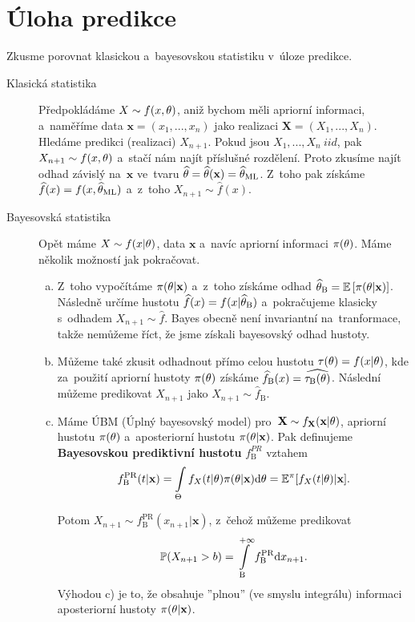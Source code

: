 \section{Úloha predikce}
Zkusme porovnat klasickou a~bayesovskou statistiku v~úloze predikce.
\begin{description}
	\item[Klasická statistika] Předpokládáme $X\sim f(x,\theta)$, aniž bychom měli apriorní informaci, a~naměříme data $\textbf{x}=(x_1,...,x_n)$ jako realizaci $\textbf{X}=(X_1,...,X_n)$. Hledáme predikci (realizaci) $X_{n+1}$. Pokud jsou $X_1,...,X_n ~iid$, pak $X_{n+1}\sim f(x,\theta)$ a~stačí nám najít příslušné rozdělení. Proto zkusíme najít odhad závislý na~$\textbf{x}$ ve~tvaru $\widehat{\theta}=\widehat{\theta}(\textbf{x})=\widehat{\theta}_{\mathrm{ML}}$. Z~toho pak získáme $\widehat{f}(x)=f(x,\widehat{\theta}_\mathrm{ML})$ a~z~toho $X_{n+1}\sim\widehat{f}(x)$.
	\item[Bayesovská statistika] Opět máme $X\sim f(x|\theta)$, data $\textbf{x}$ a~navíc apriorní informaci $\pi(\theta)$. Máme několik možností jak pokračovat.
	\begin{enumerate}[a)]
		\item  Z~toho vypočítáme $\pi(\theta|\textbf{x})$ a~z~toho získáme odhad $\widehat{\theta}_\mathrm{B}=\mathbb{E}\left[ \pi(\theta|\textbf{x}) \right]$. Následně určíme hustotu $\widehat{f}(x)=f(x|\widehat{\theta}_\mathrm{B})$ a~pokračujeme klasicky s~odhadem $X_{n+1}\sim\widehat{f}$. Bayes obecně není invariantní na~tranformace, takže nemůžeme říct, že jsme získali bayesovský odhad hustoty.
		
		\item Můžeme také zkusit odhadnout přímo celou hustotu $\tau(\theta)=f(x|\theta)$, kde za~použití apriorní hustoty $\pi(\theta)$ získáme $\widehat{f}_\mathrm{B}(x)=\widehat{\tau_\mathrm{B}(\theta)}$. Následní můžeme predikovat $X_{n+1}$ jako $X_{n+1}\sim\widehat{f}_\mathrm{B}$.
		
		\item \begin{define} Máme ÚBM (Úplný bayesovský model) pro~$\textbf{X}\sim f_{\textbf{X}}(\textbf{x}|\theta)$, apriorní hustotu $\pi(\theta)$ a~aposteriorní hustotu $\pi(\theta|\textbf{x})$. Pak definujeme \textbf{Bayesovskou prediktivní hustotu} $f_\mathrm{B}^{PR} $ vztahem
		$$ f_\mathrm{B}^\mathrm{PR}(t|\textbf{x})=\int\limits_{\Theta} f_X(t|\theta)\pi(\theta|\textbf{x})\mathrm{d}\theta=\mathbb{E}^\pi[f_X(t|\theta)|\textbf{x}].$$
		\end{define}
		Potom
		$ X_{n+1}\sim f_\mathrm{B}^\mathrm{PR}(x_{n+1}|\textbf{x})$, z~čehož můžeme predikovat $$\mathbb{P}(X_{n+1}>b)=\int\limits_\mathrm{B}^{+\infty}f_\mathrm{B}^\mathrm{PR}\mathrm{d} x_{n+1}.$$
		Výhodou c) je to, že obsahuje ''plnou'' (ve smyslu integrálu) informaci aposteriorní hustoty $\pi(\theta|\textbf{x})$.
	\end{enumerate}
\end{description}




